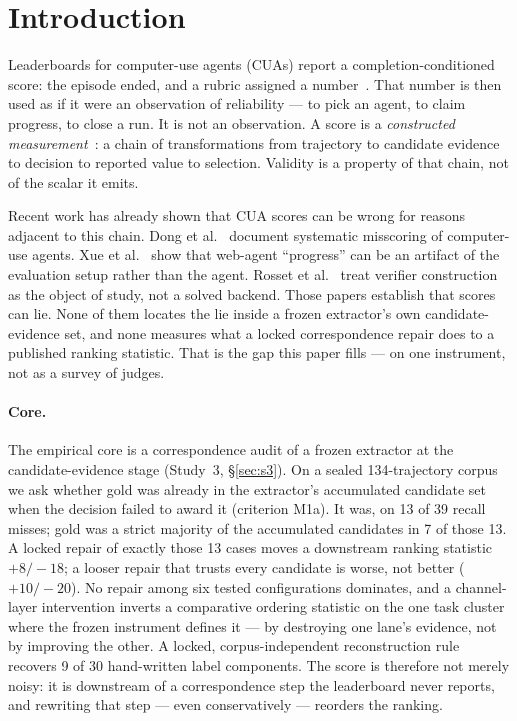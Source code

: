 \documentclass[sigconf,anonymous]{aamas}
\begin{document}

\maketitle

\section{Introduction}
\label{sec:intro}

Leaderboards for computer-use agents (CUAs) report a completion-conditioned score: the episode ended, and a rubric assigned a number~\citep{jang2026mypcbench,xie2024osworld,zhou2024webarena}.
That number is then used as if it were an observation of reliability --- to pick an agent, to claim progress, to close a run.
It is not an observation.
A score is a \emph{constructed measurement}~\citep{cronbach1955construct,messick1995validity,kane2013validating}: a chain of transformations from trajectory to candidate evidence to decision to reported value to selection.
Validity is a property of that chain, not of the scalar it emits.

Recent work has already shown that CUA scores can be wrong for reasons adjacent to this chain.
Dong et al.~\citep{dong2026misscore} document systematic misscoring of computer-use agents.
Xue et al.~\citep{xue2025illusion} show that web-agent ``progress'' can be an artifact of the evaluation setup rather than the agent.
Rosset et al.~\citep{rosset2026verifiers} treat verifier construction as the object of study, not a solved backend.
Those papers establish that scores can lie.
None of them locates the lie inside a frozen extractor's own candidate-evidence set, and none measures what a locked correspondence repair does to a published ranking statistic.
That is the gap this paper fills --- on one instrument, not as a survey of judges.

\paragraph{Core.}
The empirical core is a correspondence audit of a frozen extractor at the candidate-evidence stage (Study~3, \S\ref{sec:s3}).
On a sealed 134-trajectory corpus we ask whether gold was already in the extractor's accumulated candidate set when the decision failed to award it (criterion M1a).
It was, on 13 of 39 recall misses; gold was a strict majority of the accumulated candidates in 7 of those 13.
A locked repair of exactly those 13 cases moves a downstream ranking statistic $+8/-18$; a looser repair that trusts every candidate is worse, not better ($+10/-20$).
No repair among six tested configurations dominates, and a channel-layer intervention inverts a comparative ordering statistic on the one task cluster where the frozen instrument defines it --- by destroying one lane's evidence, not by improving the other.
A locked, corpus-independent reconstruction rule recovers 9 of 30 hand-written label components.
The score is therefore not merely noisy: it is downstream of a correspondence step the leaderboard never reports, and rewriting that step --- even conservatively --- reorders the ranking.
\end{document}
